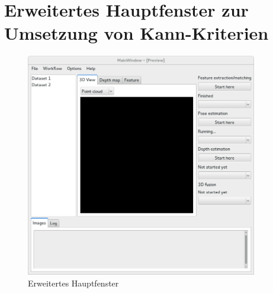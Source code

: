 \newpage

\section{Erweitertes Hauptfenster zur Umsetzung von Kann-Kriterien}

\begin{figure}[h]
	\centering
	\includegraphics[width=0.9\textwidth]{img/Screenshot_advanced.png}
	\caption{Erweitertes Hauptfenster}
	\label{fig:Erweitertes Hauptfenster}
\end{figure}

